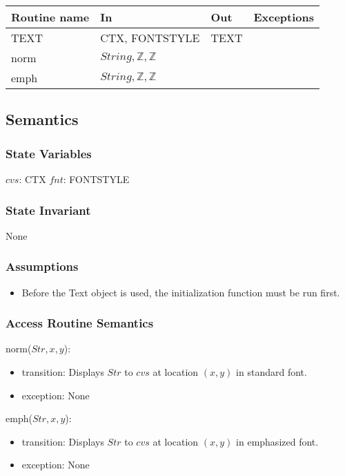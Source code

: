 \documentclass[12pt]{article}
\begin{document}
\begin{tabular}{| l | l | l | l |}
\hline
\textbf{Routine name} & \textbf{In} & \textbf{Out} & \textbf{Exceptions}\\
\hline
TEXT & CTX, FONTSTYLE & TEXT & ~\\
\hline
norm & $String, \mathbb{Z}, \mathbb{Z}$ &  & ~\\
\hline
emph & $String, \mathbb{Z}, \mathbb{Z}$ &  & ~\\
\hline
\end{tabular}

\subsection*{Semantics}

\subsubsection*{State Variables}

$cvs$: CTX %
$fnt$: FONTSTYLE %

\subsubsection*{State Invariant}

None

\subsubsection*{Assumptions}

\begin{itemize}
  \item Before the Text object is used, the initialization function must be run first.
\end{itemize}

\subsubsection*{Access Routine Semantics}

norm($Str,x,y$):
\begin{itemize}
    \item transition: Displays $Str$ to $cvs$ at location $(x,y)$ in standard font.
    \item exception: None
\end{itemize}

emph($Str,x,y$):
\begin{itemize}
    \item transition: Displays $Str$ to $cvs$ at location $(x,y)$ in emphasized font.
    \item exception: None
\end{itemize}
\end{document}
